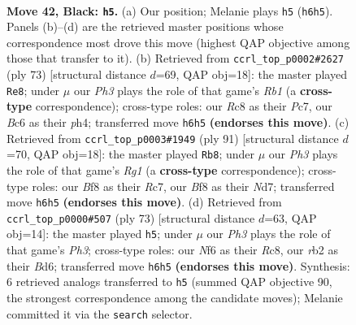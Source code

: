 \documentclass[11pt]{article}
\begin{document}
\clearpage

\begin{figure}[p]\centering
\begin{subfigure}{0.46\textwidth}\centering
\resizebox{\linewidth}{!}{%
\newchessgame
\chessboard[
  setfen={2r2b2/p5p1/P1b2nkp/1p3p2/1P3P1K/4P1P1/1R6/RNB5 b - - 14 42},
  showmover=false,
  pgfstyle=straightmove, color=movearrow, markmove={h6-h5}
]}
\caption{}
\end{subfigure}\hfill
\begin{subfigure}{0.46\textwidth}\centering
\resizebox{\linewidth}{!}{%
\newchessgame
\chessboard[
  setfen={1r6/2p5/3b2p1/1kp4p/2p1p2P/R3P1P1/PPK2P2/4B3 b - - 4 37},
  showmover=false,
  pgfstyle=straightmove, color=movearrow, markmove={b8-e8}
]}
\caption{}
\end{subfigure}
\\[4pt]
\begin{subfigure}{0.46\textwidth}\centering
\resizebox{\linewidth}{!}{%
\newchessgame
\chessboard[
  setfen={6r1/2rn1p2/4bk2/R1Pp2p1/4p2p/RN2P2P/3K1PP1/5B2 b - - 10 46},
  showmover=false,
  pgfstyle=straightmove, color=movearrow, markmove={g8-b8}
]}
\caption{}
\end{subfigure}\hfill
\begin{subfigure}{0.46\textwidth}\centering
\resizebox{\linewidth}{!}{%
\newchessgame
\chessboard[
  setfen={2r5/2p3p1/3b2kp/1p1Pp3/p3P2P/P1B3P1/1P1R2K1/8 b - - 0 37},
  showmover=false,
  pgfstyle=straightmove, color=movearrow, markmove={h6-h5}
]}
\caption{}
\end{subfigure}
\caption{\textbf{Move 42, Black: \texttt{h5}.} (a) Our position; Melanie plays \texttt{h5} (\texttt{h6h5}). Panels (b)--(d) are the retrieved master positions whose correspondence most drove this move (highest QAP objective among those that transfer to it). (b) Retrieved from \texttt{ccrl\_top\_p0002\#2627} (ply 73) [structural distance $d$=69, QAP obj=18]: the master played \texttt{Re8}; under $\mu$ our \emph{Ph3} plays the role of that game's \emph{Rb1} (a \textbf{cross-type} correspondence); cross-type roles: our \emph{R}c8 as their \emph{P}c7, our \emph{B}c6 as their \emph{p}h4; transferred move \texttt{h6h5} \textbf{(endorses this move)}. (c) Retrieved from \texttt{ccrl\_top\_p0003\#1949} (ply 91) [structural distance $d$=70, QAP obj=18]: the master played \texttt{Rb8}; under $\mu$ our \emph{Ph3} plays the role of that game's \emph{Rg1} (a \textbf{cross-type} correspondence); cross-type roles: our \emph{B}f8 as their \emph{R}c7, our \emph{B}f8 as their \emph{N}d7; transferred move \texttt{h6h5} \textbf{(endorses this move)}. (d) Retrieved from \texttt{ccrl\_top\_p0000\#507} (ply 73) [structural distance $d$=63, QAP obj=14]: the master played \texttt{h5}; under $\mu$ our \emph{Ph3} plays the role of that game's \emph{Ph3}; cross-type roles: our \emph{N}f6 as their \emph{R}c8, our \emph{r}b2 as their \emph{B}d6; transferred move \texttt{h6h5} \textbf{(endorses this move)}. Synthesis: 6 retrieved analogs transferred to \texttt{h5} (summed QAP objective 90, the strongest correspondence among the candidate moves); Melanie committed it via the \texttt{search} selector.}
\label{fig:thought-m83}
\end{figure}
\end{document}
